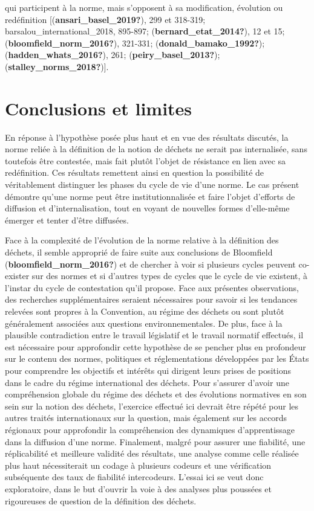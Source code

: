 \documentclass[12pt]{ulaval}
\begin{document}
qui participent à la norme, mais s'opposent à sa modification, évolution ou redéfinition {[}(\textbf{ansari\_basel\_2019?}), 299 et 318-319; barsalou\_international\_2018, 895-897; (\textbf{bernard\_etat\_2014?}), 12 et 15; (\textbf{bloomfield\_norm\_2016?}), 321-331; (\textbf{donald\_bamako\_1992?}); (\textbf{hadden\_whats\_2016?}), 261; (\textbf{peiry\_basel\_2013?}); (\textbf{stalley\_norms\_2018?}){]}.

\section{Conclusions et limites}\label{conclusions-et-limites}

En réponse à l'hypothèse posée plus haut et en vue des résultats discutés, la norme reliée à la définition de la notion de déchets ne serait pas internalisée, sans toutefois être contestée, mais fait plutôt l'objet de résistance en lien avec sa redéfinition. Ces résultats remettent ainsi en question la possibilité de véritablement distinguer les phases du cycle de vie d'une norme. Le cas présent démontre qu'une norme peut être institutionnalisée et faire l'objet d'efforts de diffusion et d'internalisation, tout en voyant de nouvelles formes d'elle-même émerger et tenter d'être diffusées.

Face à la complexité de l'évolution de la norme relative à la définition des déchets, il semble approprié de faire suite aux conclusions de Bloomfield (\textbf{bloomfield\_norm\_2016?}) et de chercher à voir si plusieurs cycles peuvent co-exister sur des normes et si d'autres types de cycles que le cycle de vie existent, à l'instar du cycle de contestation qu'il propose. Face aux présentes observations, des recherches supplémentaires seraient nécessaires pour savoir si les tendances relevées sont propres à la Convention, au régime des déchets ou sont plutôt généralement associées aux questions environnementales. De plus, face à la plausible contradiction entre le travail législatif et le travail normatif effectués, il est nécessaire pour approfondir cette hypothèse de se pencher plus en profondeur sur le contenu des normes, politiques et réglementations développées par les États pour comprendre les objectifs et intérêts qui dirigent leurs prises de positions dans le cadre du régime international des déchets. Pour s'assurer d'avoir une compréhension globale du régime des déchets et des évolutions normatives en son sein sur la notion des déchets, l'exercice effectué ici devrait être répété pour les autres traités internationaux sur la question, mais également sur les accords régionaux pour approfondir la compréhension des dynamiques d'apprentissage dans la diffusion d'une norme. Finalement, malgré pour assurer une fiabilité, une réplicabilité et meilleure validité des résultats, une analyse comme celle réalisée plus haut nécessiterait un codage à plusieurs codeurs et une vérification subséquente des taux de fiabilité intercodeurs. L'essai ici se veut donc exploratoire, dans le but d'ouvrir la voie à des analyses plus poussées et rigoureuses de question de la définition des déchets.
\end{document}
